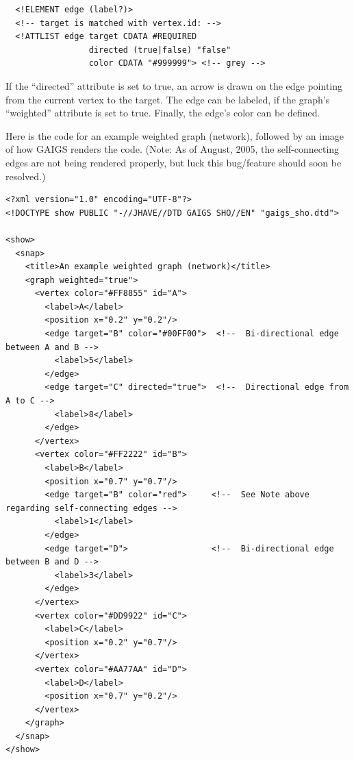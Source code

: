 \documentclass[12pt]{article}
\begin{document}
\footnotesize \begin{verbatim}
  <!ELEMENT edge (label?)>
  <!-- target is matched with vertex.id: -->
  <!ATTLIST edge target CDATA #REQUIRED
                 directed (true|false) "false"
                 color CDATA "#999999"> <!-- grey -->
\end{verbatim} \normalsize

If the ``directed'' attribute is set to true, an arrow is drawn on the
edge pointing from the current vertex to the target. The edge can be
labeled, if the graph's ``weighted'' attribute is set to true.
Finally, the edge's color can be defined.

Here is the code for an example weighted graph (network), followed by
an image of how GAIGS renders the code. (Note: As of August, 2005, the
self-connecting edges are not being rendered properly, but 
luck this bug/feature should soon be resolved.)

\footnotesize \begin{verbatim}
<?xml version="1.0" encoding="UTF-8"?>
<!DOCTYPE show PUBLIC "-//JHAVE//DTD GAIGS SHO//EN" "gaigs_sho.dtd">

<show>
  <snap>
    <title>An example weighted graph (network)</title>
    <graph weighted="true">
      <vertex color="#FF8855" id="A">
        <label>A</label>
        <position x="0.2" y="0.2"/>
        <edge target="B" color="#00FF00">  <!--  Bi-directional edge between A and B -->
          <label>5</label>
        </edge>
        <edge target="C" directed="true">  <!--  Directional edge from A to C -->
          <label>8</label>
        </edge>
      </vertex>
      <vertex color="#FF2222" id="B">
        <label>B</label>
        <position x="0.7" y="0.7"/>
        <edge target="B" color="red">     <!--  See Note above regarding self-connecting edges -->
          <label>1</label>
        </edge>
        <edge target="D">                 <!--  Bi-directional edge between B and D -->
          <label>3</label>
        </edge>
      </vertex>
      <vertex color="#DD9922" id="C">
        <label>C</label>
        <position x="0.2" y="0.7"/>
      </vertex>
      <vertex color="#AA77AA" id="D">
        <label>D</label>
        <position x="0.7" y="0.2"/>
      </vertex>
    </graph>
  </snap>
</show>
\end{verbatim} \normalsize
\end{document}
